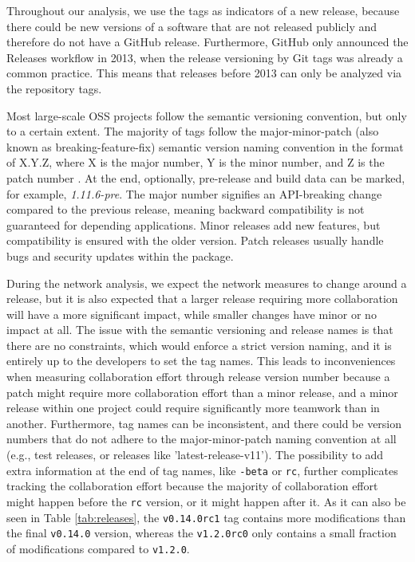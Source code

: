 Throughout our analysis, we use the tags as indicators of a new release, because there could be new versions of a software that are not released publicly and therefore do not have a GitHub release. Furthermore, GitHub only announced the Releases workflow in 2013, when the release versioning by Git tags was already a common practice. This means that releases before 2013 can only be analyzed via the repository tags.

Most large-scale OSS projects follow the semantic versioning convention, but only to a certain extent. The majority of tags follow the major-minor-patch (also known as breaking-feature-fix) semantic version naming convention in the format of X.Y.Z, where X is the major number, Y is the minor number, and Z is the patch number \cite{preston-wernerSemanticVersioning}. At the end, optionally, pre-release and build data can be marked, for example, \textit{1.11.6-pre}. The major number signifies an API-breaking change compared to the previous release, meaning backward compatibility is not guaranteed for depending applications. Minor releases add new features, but compatibility is ensured with the older version. Patch releases usually handle bugs and security updates within the package.

During the network analysis, we expect the network measures to change around a release, but it is also expected that a larger release requiring more collaboration will have a more significant impact, while smaller changes have minor or no impact at all. The issue with the semantic versioning and release names is that there are no constraints, which would enforce a strict version naming, and it is entirely up to the developers to set the tag names. This leads to inconveniences when measuring collaboration effort through release version number because a patch might require more collaboration effort than a minor release, and a minor release within one project could require significantly more teamwork than in another. Furthermore, tag names can be inconsistent, and there could be version numbers that do not adhere to the major-minor-patch naming convention at all (e.g., test releases, or releases like 'latest-release-v11'). The possibility to add extra information at the end of tag names, like \texttt{-beta} or \texttt{rc}, further complicates tracking the collaboration effort because the majority of collaboration effort might happen before the \texttt{rc} version, or it might happen after it. As it can also be seen in Table \ref{tab:releases}, the \texttt{v0.14.0rc1} tag contains more modifications than the final \texttt{v0.14.0} version, whereas the \texttt{v1.2.0rc0} only contains a small fraction of modifications compared to \texttt{v1.2.0}.

